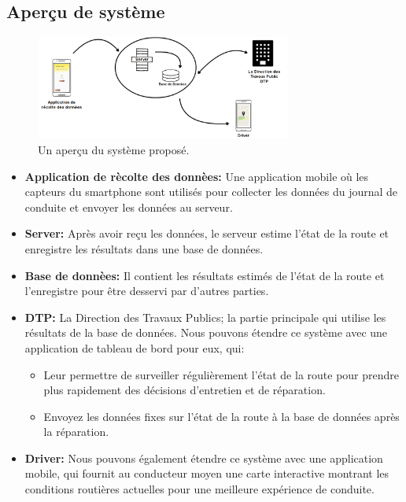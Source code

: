 \subsection{Aperçu de système}
\begin{figure}[h!]
    \center
    \includegraphics[width=0.75\textwidth]{Images/chapter3/systemOverview.png}
    \caption{Un aperçu du système proposé.}
    \label{fig:System}
\end{figure}

\begin{itemize}
    \item \textbf{Application de rècolte des donnèes:} Une application mobile où les capteurs du smartphone sont utilisés pour collecter les données du journal de conduite et envoyer les données au serveur.
    \item  \textbf{Server:} Après avoir reçu les données, le serveur estime l'état de la route et enregistre les résultats dans une base de données.
    \item \textbf{Base de donnèes:} Il contient les résultats estimés de l'état de la route et l'enregistre pour être desservi par d'autres parties.
    \item  \textbf{DTP:} La Direction des Travaux Publics; la partie principale qui utilise les résultats de la base de données. Nous pouvons étendre ce système avec une application de tableau de bord pour eux, qui: \begin{itemize}
              \item Leur permettre de surveiller régulièrement l'état de la route pour prendre plus rapidement des décisions d'entretien et de réparation.
              \item Envoyez les données fixes sur l'état de la route à la base de données après la réparation.
          \end{itemize}
    \item \textbf{Driver:} Nous pouvons également étendre ce système avec une application mobile, qui fournit au conducteur moyen une carte interactive montrant les conditions routières actuelles pour une meilleure expérience de conduite.
\end{itemize}

